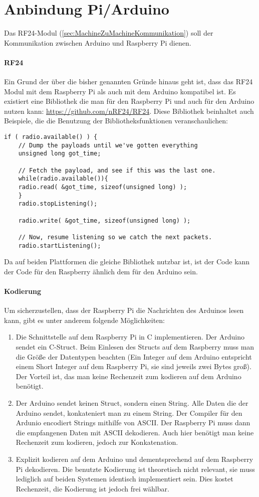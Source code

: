 \section{Anbindung Pi/Arduino}
\label{sec:anbindung_raspi_arduino}
Das RF24-Modul (\ref{sec:MachineZuMachineKommunikation}) soll der Kommunikation zwischen Arduino und Raspberry Pi dienen. 
\paragraph{RF24}
Ein Grund der über die bisher genannten Gründe hinaus geht ist, dass das RF24 Modul mit dem Raspberry Pi als auch mit dem Arduino kompatibel ist. Es existiert eine Bibliothek die man für den Raspberry Pi und auch für den Arduino nutzen kann: \url{https://github.com/nRF24/RF24}. Diese Bibliothek beinhaltet auch Beispiele, die die Benutzung der Bibliotheksfunktionen veranschaulichen: 
\lstset{language=c}
\begin{lstlisting}
if ( radio.available() ) {
	// Dump the payloads until we've gotten everything
	unsigned long got_time;
	
	// Fetch the payload, and see if this was the last one.
	while(radio.available()){
	radio.read( &got_time, sizeof(unsigned long) );
	}
	radio.stopListening();
				
	radio.write( &got_time, sizeof(unsigned long) );

	// Now, resume listening so we catch the next packets.
	radio.startListening();
\end{lstlisting}

Da auf beiden Plattformen die gleiche Bibliothek nutzbar ist, ist der Code kann der Code für den Raspberry ähnlich dem für den Arduino sein.
\paragraph{Kodierung}
Um sicherzustellen, dass der Raspberry Pi die Nachrichten des Arduinos lesen kann, gibt es unter anderem folgende Möglichkeiten:
\begin{enumerate}
\item Die Schnittstelle auf dem Raspberry Pi in C implementieren. Der Arduino sendet ein C-Struct. Beim Einlesen des Structs auf dem Raspberry muss man die Größe der Datentypen beachten (Ein Integer auf dem Arduino entspricht einem Short Integer auf dem Raspberry Pi, sie sind jeweils zwei Bytes groß). Der Vorteil ist, das man keine Rechenzeit zum kodieren auf dem Arduino benötigt.
\item Der Arduino sendet keinen Struct, sondern einen String. Alle Daten die der Arduino sendet, konkateniert man zu einem String. Der Compiler für den Ardunio encodiert Strings mithilfe von ASCII. Der Raspberry Pi muss dann die empfangenen Daten mit ASCII dekodieren. Auch hier benötigt man keine Rechenzeit zum kodieren, jedoch zur Konkatenation.
\item Explizit kodieren auf dem Arduino und dementsprechend auf dem Raspberry Pi dekodieren. Die benutzte Kodierung ist theoretisch nicht relevant, sie muss lediglich auf beiden Systemen identisch implementiert sein. Dies kostet Rechenzeit, die Kodierung ist jedoch frei wählbar.
\end{enumerate}

